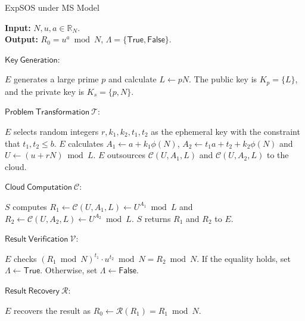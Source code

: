 \documentclass[english,draftcls,onecolumn,11pt]{IEEEtran}
\theoremstyle{definition}
\theoremstyle{plain}
\theoremstyle{plain}
\theoremstyle{definition}
\begin{document}
\begin{algorithm}[tbh] 
\caption{ExpSOS under MS Model\label{alg:Result-Verification-Scheme}}

\smallskip 
\textbf{Input:} $N,u,a\in\mathbb{R}_N$.\\
\textbf{Output:} $R_0=u^a\bmod N$, $\Lambda=\{\mathsf{True},\mathsf{False}\}.$

\smallskip 
$\mathsf{Key~Generation}$:
\begin{algorithmic}[1] 
\STATE $E$ generates a large prime $p$ and calculate $L\leftarrow pN$. 
\STATE The public key is $K_p=\{L\}$, and the private key is $K_s=\{p,N\}$.  
\end{algorithmic} 

\smallskip 
$\mathsf{Problem~Transformation}~\mathcal{T}$:  
\begin{algorithmic}[1] 
\STATE $E$ selects random integers $r,k_1,k_2,t_1,t_2$  as the ephemeral key with the constraint that $t_1,t_2\leq b$.
\STATE $E$ calculates $A_1\leftarrow a+k_1\phi(N)$, $A_2 \leftarrow t_1 a+t_2+k_2 \phi(N)$ and $U\leftarrow (u+rN)\bmod L$.
\STATE $E$ outsources $\mathcal{C}(U,A_1,L)$ and $\mathcal{C}(U,A_2,L)$ to the cloud.
\end{algorithmic} 

\smallskip
$\mathsf{Cloud~Computation}~\mathcal{C}$:
\begin{algorithmic}[1] 
\STATE $S$ computes $R_1\leftarrow\mathcal{C}(U,A_1,L)\leftarrow U^{A_1}\bmod L$ and $R_2\leftarrow\mathcal{C}(U,A_2,L)\leftarrow U^{A_2}\bmod L$.
\STATE $S$ returns $R_1$ and $R_2$ to $E$.
\end{algorithmic} 

\smallskip
$\mathsf{Result~Verification}~\mathcal{V}$:
\begin{algorithmic}[1] 
\STATE $E$ checks $(R_1 \bmod N)^{t_1} \cdot u^{t_2} \bmod N = R_2 \bmod N$.
\STATE If the equality holds, set $\Lambda \leftarrow \mathsf{True}$. Otherwise, set $\Lambda \leftarrow \mathsf{False}$.
\end{algorithmic} 

\smallskip
$\mathsf{Result~Recovery}~\mathcal{R}$:
\begin{algorithmic}[1] 
\STATE $E$ recovers the result as $R_0\leftarrow \mathcal{R}(R_1)=R_1\bmod N$.
\end{algorithmic} 
\end{algorithm}
\end{document}

